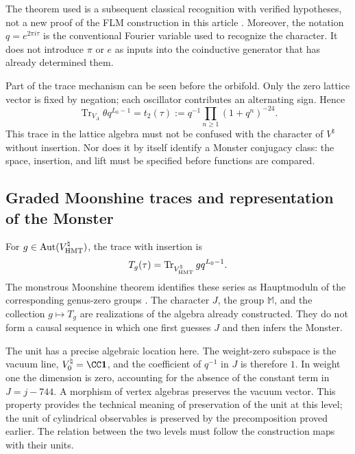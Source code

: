 The theorem used is a subsequent classical recognition with verified
hypotheses, not a new proof of the FLM construction in this article
\cite{flm}.
Moreover, the notation $q=e^{2\pi i\tau}$ is the conventional Fourier
variable used to recognize the character. It does not introduce $\pi$
or $e$ as inputs into the coinductive generator that has already determined them.

Part of the trace mechanism can be seen before the orbifold.
Only the zero lattice vector is fixed by negation; each
oscillator contributes an alternating sign. Hence
\[
 \operatorname{Tr}_{V_\Lambda}\theta q^{L_0-1}
   =t_2(\tau)
   :=q^{-1}\prod_{n\geq1}(1+q^n)^{-24}.
\]
This trace in the lattice algebra must not be confused with the
character of $V^\natural$ without insertion. Nor does it by
itself identify a Monster conjugacy class: the space, insertion,
and lift must be specified before functions are compared.







\subsection{Graded Moonshine traces and representation of the Monster}
\label{exc:alcance}

For $g\in\operatorname{Aut}(V^\natural_{\rm HMT})$, the trace
with insertion is
\[
 T_g(\tau)=
 \operatorname{Tr}_{V^\natural_{\rm HMT}}gq^{L_0-1}.
\]
The monstrous Moonshine theorem identifies these series as
Hauptmoduln of the corresponding genus-zero groups
\cite[Theorem~1.1]{borcherds}.
The character $J$, the group $\mathbb M$, and the collection $g\mapsto T_g$
are realizations of the algebra already constructed. They do not form a causal
sequence in which one first guesses $J$ and then infers the Monster.

The unit has a precise algebraic location here. The weight-zero
subspace is the vacuum line, \(V^\natural_0=\CC\mathbf1\), and
the coefficient of \(q^{-1}\) in \(J\) is therefore \(1\). In weight one
the dimension is zero, accounting for the absence of the constant term
in \(J=j-744\). A morphism of vertex algebras preserves the vacuum
vector. This property provides the technical meaning of preservation
of the unit at this level; the unit of cylindrical observables
is preserved by the precomposition proved earlier. The relation
between the two levels must follow the construction maps with their units.

